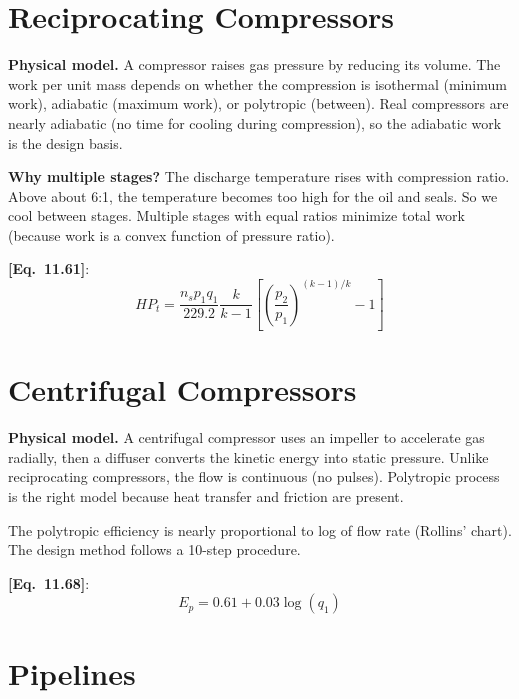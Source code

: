 \documentclass[11pt,a4paper,openany]{book}
\newcommand{\eqrefbook}[1]{\textcolor{blue!60!black}{\textbf{[Eq.~#1]}}}
\begin{document}
\section{Reciprocating Compressors}

\begin{theory}
\textbf{Physical model.} A compressor raises gas pressure by reducing
its volume. The work per unit mass depends on whether the compression
is isothermal (minimum work), adiabatic (maximum work), or polytropic
(between). Real compressors are nearly adiabatic (no time for cooling
during compression), so the adiabatic work is the design basis.

\textbf{Why multiple stages?} The discharge temperature rises with
compression ratio. Above about 6:1, the temperature becomes too high
for the oil and seals. So we cool between stages. Multiple stages with
equal ratios minimize total work (because work is a convex function of
pressure ratio).
\end{theory}

\eqrefbook{11.61}:
\begin{equation}
  HP_t = \frac{n_s p_1 q_1}{229.2}
  \frac{k}{k-1}\left[\left(\frac{p_2}{p_1}\right)^{(k-1)/k} - 1\right]
\end{equation}

\section{Centrifugal Compressors}

\begin{theory}
\textbf{Physical model.} A centrifugal compressor uses an impeller to
accelerate gas radially, then a diffuser converts the kinetic energy
into static pressure. Unlike reciprocating compressors, the flow is
continuous (no pulses). Polytropic process is the right model because
heat transfer and friction are present.

The polytropic efficiency is nearly proportional to log of flow rate
(Rollins' chart). The design method follows a 10-step procedure.
\end{theory}

\eqrefbook{11.68}:
\begin{equation}
  E_p = 0.61 + 0.03\log(q_1)
\end{equation}

\section{Pipelines}
\end{document}
